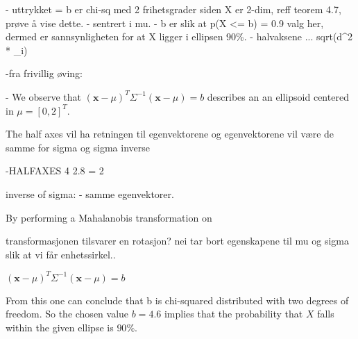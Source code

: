 - uttrykket = b er chi-sq med 2 frihetsgrader siden X er 2-dim, reff teorem 4.7, prøve å vise dette. 
- sentrert i mu.
- b er slik at p(X <= b) = 0.9 valg her, dermed er sannsynligheten for at X ligger i ellipsen 90\%. 
- halvaksene ... sqrt(d^2 * \lambda_i) 


-fra frivillig øving: 

- 
We observe that $(\textbf{x}- {\mu})^T \Sigma^{-1} (\textbf{x}-{\mu})=b$ describes an an ellipsoid centered in $\mu = [0, 2]^T$. 

The half axes vil ha retningen til egenvektorene og 
egenvektorene vil være de samme for sigma og sigma inverse 

-HALFAXES
4
2.8 = 2

inverse of sigma:
- samme egenvektorer.

By performing a Mahalanobis transformation on 

transformasjonen tilsvarer en rotasjon?
nei tar bort egenskapene til mu og sigma slik at vi får enhetssirkel..

$(\textbf{x}- {\mu})^T \Sigma^{-1} (\textbf{x}-{\mu})=b$ %

From this one can conclude that b is chi-squared distributed with two degrees of freedom. So the chosen value $b=4.6$ implies that the probability that $X$ falls within the given ellipse is $90\%$. 